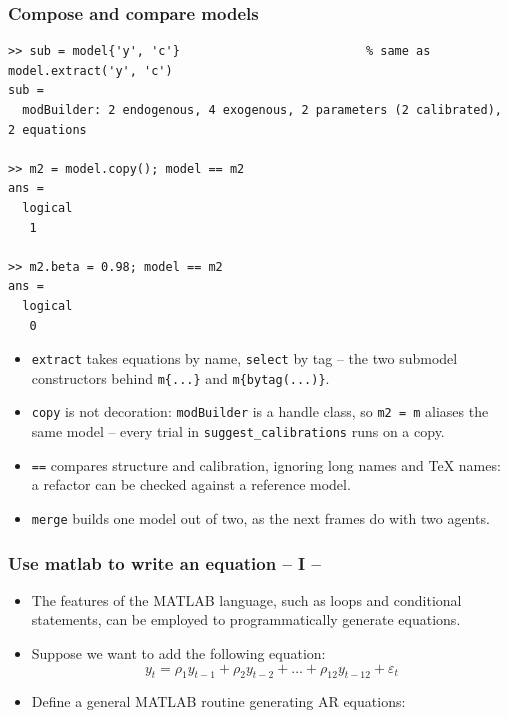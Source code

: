 \documentclass[10pt,slidestop]{beamer}
\theoremstyle{plain}
\begin{document}
\begin{frame}[c,fragile]
  \frametitle{Compose and compare models}

  \begin{lstlisting}[style=MatlabConsole,basicstyle=\ttfamily\tiny]
>> sub = model{'y', 'c'}                          % same as model.extract('y', 'c')
sub =
  modBuilder: 2 endogenous, 4 exogenous, 2 parameters (2 calibrated), 2 equations

>> m2 = model.copy(); model == m2
ans =
  logical
   1

>> m2.beta = 0.98; model == m2
ans =
  logical
   0
  \end{lstlisting}

  \begin{itemize}\small
  \item \verb+extract+ takes equations by name, \verb+select+ by tag -- the two submodel
    constructors behind \verb+m{...}+ and \verb+m{bytag(...)}+.
  \item \verb+copy+ is not decoration: \verb+modBuilder+ is a handle class, so \verb+m2 = m+
    aliases the same model -- every trial in \verb+suggest_calibrations+ runs on a copy.
  \item \verb+==+ compares structure and calibration, ignoring long names and \TeX{} names:
    a refactor can be checked against a reference model.
  \item \verb+merge+ builds one model out of two, as the next frames do with two agents.
  \end{itemize}

\end{frame}


\begin{frame}[c,fragile]
  \frametitle{Use matlab to write an equation -- I --}

  \begin{itemize}

  \item The features of the MATLAB language, such as loops and conditional statements, can be employed to programmatically generate equations.\newline

  \item Suppose we want to add the following equation:
    \[
      y_t = \rho_1 y_{t-1} + \rho_2 y_{t-2} + \dots + \rho_{12} y_{t-12} + \varepsilon_t
    \]

    \medskip

  \item Define a general MATLAB routine generating AR equations:\newline

    

  \end{itemize}

\end{frame}
\end{document}
